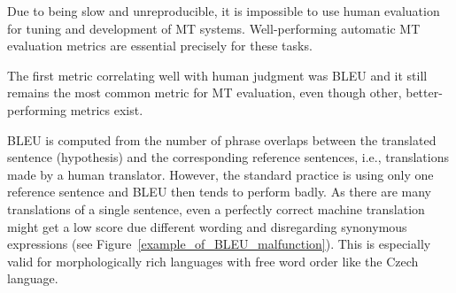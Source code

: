 \documentclass[11pt]{article}
\def\Fref#1{Figure~\ref{#1}}
\begin{document}
Due to being slow and unreproducible, it is impossible to use human evaluation
for tuning and development of MT systems. Well-performing automatic MT evaluation
metrics are essential precisely for these tasks.

The first metric correlating well with human judgment was BLEU \cite{bleu} and
it still remains the most common metric for MT evaluation, even though other,
better-performing metrics exist. \cite{wmt13-metrics} %

BLEU is computed from the number of phrase overlaps between the translated
sentence (hypothesis) and the corresponding reference sentences, i.e., translations
made by a human translator. However, the standard practice is using only one reference
sentence and BLEU then tends to perform badly. As there are many translations of 
a single sentence, even a perfectly correct machine translation might get a low score 
due different wording and disregarding synonymous expressions (see \Fref{example_of_BLEU_malfunction}). 
This is especially valid for morphologically rich languages with free word order like 
the Czech language. \cite{bojar-tackling-sparse-data}
\end{document}
